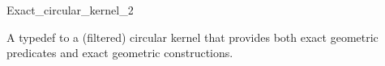 \begin{ccRefClass}{Exact_circular_kernel_2}


\ccDefinition

A typedef to a (filtered) circular kernel that provides
both exact geometric predicates and exact geometric constructions.

\ccIsModel


\ccSeeAlso


\end{ccRefClass}
